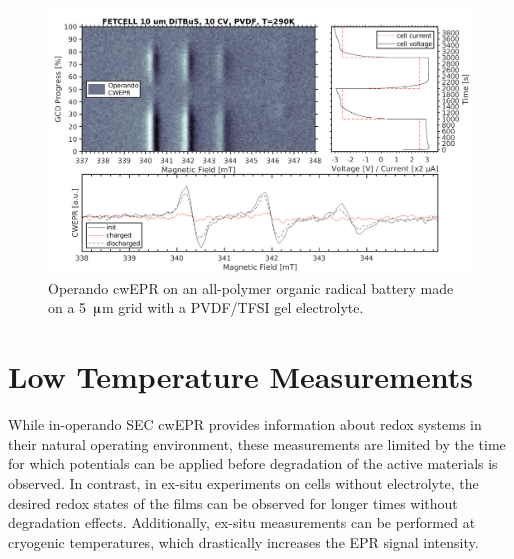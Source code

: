 \begin{figure}[h]
\center
	\includegraphics[width=1\textwidth]{./operando_epr/figures/solid/FET231114_5uA_RT.pdf}
	\caption{Operando cwEPR on an all-polymer organic radical battery made on a 5~$\muup$m grid with a PVDF/TFSI gel electrolyte.}
	\label{fig:operando_solid_battery}
\end{figure}

\section{Low Temperature Measurements}
%
While in-operando SEC cwEPR provides information about redox systems in their natural operating environment, these measurements are limited by the time for which potentials can be applied before degradation of the active materials is observed. In contrast, in ex-situ experiments on cells without electrolyte, the desired redox states of the films can be observed for longer times without degradation effects. Additionally, ex-situ measurements can be performed at cryogenic temperatures, which drastically increases the EPR signal intensity.
%


